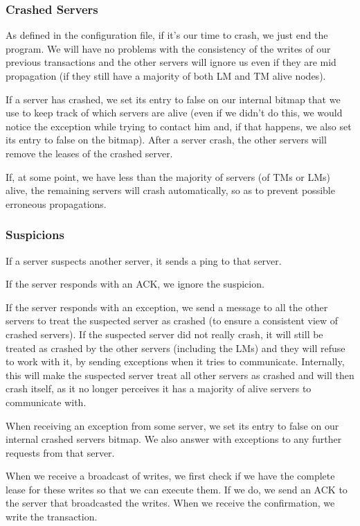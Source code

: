 \documentclass[times, 10pt,twocolumn]{article}
\begin{document}
\subsubsection{Crashed Servers}

As defined in the configuration file, if it's our time to crash, we just end the program.
We will have no problems with the consistency of the writes of our previous transactions and the other servers will ignore us even if they are mid propagation (if they still have a majority of both LM and TM alive nodes).

If a server has crashed, we set its entry to false on our internal bitmap that we use to keep track of which servers are alive (even if we didn't do this, we would notice the exception while trying to contact him and, if that happens, we also set its entry to false on the bitmap).
After a server crash, the other servers will remove the leases of the crashed server.

If, at some point, we have less than the majority of servers (of TMs or LMs) alive, the remaining servers will crash automatically, so as to prevent possible erroneous propagations.

\subsubsection{Suspicions}

If a server suspects another server, it sends a ping to that server.

If the server responds with an ACK, we ignore the suspicion.

If the server responds with an exception, we send a message to all the other servers to treat the suspected server as crashed (to ensure a consistent view of crashed servers).
If the suspected server did not really crash, it will still be treated as crashed by the other servers (including the LMs) and they will refuse to work with it, by sending exceptions when it tries to communicate.
Internally, this will make the suspected server treat all other servers as crashed and will then crash itself, as it no longer perceives it has a majority of alive servers to communicate with.

When receiving an exception from some server, we set its entry to false on our internal crashed servers bitmap.
We also answer with exceptions to any further requests from that server.


When we receive a broadcast of writes, we first check if we have the complete lease for these writes so that we can execute them.
If we do, we send an ACK to the server that broadcasted the writes.
When we receive the confirmation, we write the transaction.
\end{document}
